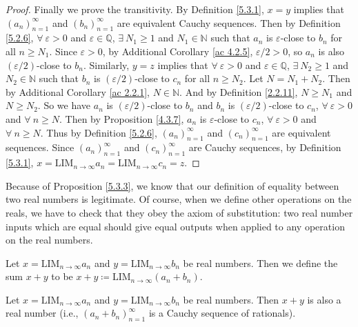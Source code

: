 \begin{proof}
Finally we prove the transitivity.
By Definition \ref{5.3.1}, \(x = y\) implies that \((a_n)_{n = 1}^{\infty}\) and \((b_n)_{n = 1}^{\infty}\) are equivalent Cauchy sequences.
Then by Definition \ref{5.2.6}, \(\forall\ \varepsilon > 0\) and \(\varepsilon \in \mathds{Q}\), \(\exists\ N_1 \geq 1\) and \(N_1 \in \mathds{N}\) such that \(a_n\) is \(\varepsilon\)-close to \(b_n\) for all \(n \geq N_1\).
Since \(\varepsilon > 0\), by Additional Corollary \ref{ac 4.2.5}, \(\varepsilon / 2 > 0\), so \(a_n\) is also \((\varepsilon / 2)\)-close to \(b_n\).
Similarly, \(y = z\) implies that \(\forall\ \varepsilon > 0\) and \(\varepsilon \in \mathds{Q}\), \(\exists\ N_2 \geq 1\) and \(N_2 \in \mathds{N}\) such that \(b_n\) is \((\varepsilon / 2)\)-close to \(c_n\) for all \(n \geq N_2\).
Let \(N = N_1 + N_2\).
Then by Additional Corollary \ref{ac 2.2.1}, \(N \in \mathds{N}\).
And by Definition \ref{2.2.11}, \(N \geq N_1\) and \(N \geq N_2\).
So we have \(a_n\) is \((\varepsilon / 2)\)-close to \(b_n\) and \(b_n\) is \((\varepsilon / 2)\)-close to \(c_n\), \(\forall\ \varepsilon > 0\) and \(\forall\ n \geq N\).
Then by Proposition \ref{4.3.7}, \(a_n\) is \(\varepsilon\)-close to \(c_n\), \(\forall\ \varepsilon > 0\) and \(\forall\ n \geq N\).
Thus by Definition \ref{5.2.6}, \((a_n)_{n = 1}^{\infty}\) and \((c_n)_{n = 1}^{\infty}\) are equivalent sequences.
Since \((a_n)_{n = 1}^{\infty}\) and \((c_n)_{n = 1}^{\infty}\) are Cauchy sequences, by Definition \ref{5.3.1}, \(x = \text{LIM}_{n \to \infty} a_n = \text{LIM}_{n \to \infty} c_n = z\).
\end{proof}

\begin{note}
Because of Proposition \ref{5.3.3}, we know that our definition of equality between two real numbers is legitimate.
Of course, when we define other operations on the reals, we have to check that they obey the axiom of substitution:
two real number inputs which are equal should give equal outputs when applied to any operation on the real numbers.
\end{note}

\begin{definition}\label{5.3.4}
Let \(x = \text{LIM}_{n \to \infty} a_n\) and \(y = \text{LIM}_{n \to \infty} b_n\) be real numbers.
Then we define the sum \(x + y\) to be \(x + y \coloneqq \text{LIM}_{n \to \infty} (a_n + b_n)\).
\end{definition}

\setcounter{theorem}{5}
\begin{lemma}\label{5.3.6}
Let \(x = \text{LIM}_{n \to \infty} a_n\) and \(y = \text{LIM}_{n \to \infty} b_n\) be real numbers.
Then \(x + y\) is also a real number
(i.e., \((a_n + b_n)_{n = 1}^{\infty}\) is a Cauchy sequence of rationals).
\end{lemma}

